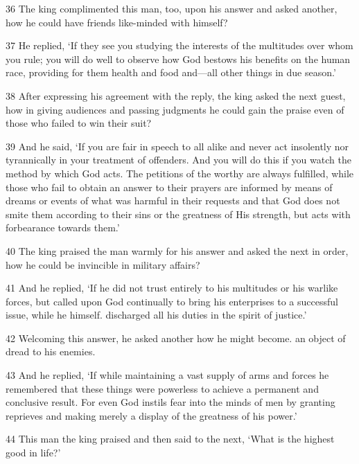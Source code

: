 \par 36 The king complimented this man, too, upon his answer and asked another, how he could have friends like-minded with himself?

\par 37 He replied, ‘If they see you studying the interests of the multitudes over whom you rule; you will do well to observe how God bestows his benefits on the human race, providing for them health and food and—all other things in due season.’

\par 38 After expressing his agreement with the reply, the king asked the next guest, how in giving audiences and passing judgments he could gain the praise even of those who failed to win their suit?

\par 39 And he said, ‘If you are fair in speech to all alike and never act insolently nor tyrannically in your treatment of offenders. And you will do this if you watch the method by which God acts. The petitions of the worthy are always fulfilled, while those who fail to obtain an answer to their prayers are informed by means of dreams or events of what was harmful in their requests and that God does not smite them according to their sins or the greatness of His strength, but acts with forbearance towards them.’

\par 40 The king praised the man warmly for his answer and asked the next in order, how he could be invincible in military affairs?

\par 41 And he replied, ‘If he did not trust entirely to his multitudes or his warlike forces, but called upon God continually to bring his enterprises to a successful issue, while he himself. discharged all his duties in the spirit of justice.’

\par 42 Welcoming this answer, he asked another how he might become. an object of dread to his enemies.

\par 43 And he replied, ‘If while maintaining a vast supply of arms and forces he remembered that these things were powerless to achieve a permanent and conclusive result. For even God instils fear into the minds of men by granting reprieves and making merely a display of the greatness of his power.’

\par 44 This man the king praised and then said to the next, ‘What is the highest good in life?’

